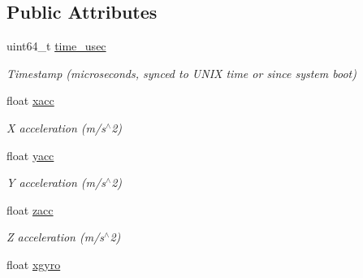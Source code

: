 \subsection*{Public Attributes}
\begin{DoxyCompactItemize}
\item 
\hypertarget{struct____mavlink__highres__imu__t_aaf1a08b7dcf5ed9ca8ce6f66c392d678}{uint64\+\_\+t \hyperlink{struct____mavlink__highres__imu__t_aaf1a08b7dcf5ed9ca8ce6f66c392d678}{time\+\_\+usec}}\label{struct____mavlink__highres__imu__t_aaf1a08b7dcf5ed9ca8ce6f66c392d678}

\begin{DoxyCompactList}\small\item\em Timestamp (microseconds, synced to U\+N\+I\+X time or since system boot) \end{DoxyCompactList}\item 
\hypertarget{struct____mavlink__highres__imu__t_ace5e765b886ddee9ea50983177bea172}{float \hyperlink{struct____mavlink__highres__imu__t_ace5e765b886ddee9ea50983177bea172}{xacc}}\label{struct____mavlink__highres__imu__t_ace5e765b886ddee9ea50983177bea172}

\begin{DoxyCompactList}\small\item\em X acceleration (m/s$^\wedge$2) \end{DoxyCompactList}\item 
\hypertarget{struct____mavlink__highres__imu__t_aedf7c76d0487a09e980851fd6162ae17}{float \hyperlink{struct____mavlink__highres__imu__t_aedf7c76d0487a09e980851fd6162ae17}{yacc}}\label{struct____mavlink__highres__imu__t_aedf7c76d0487a09e980851fd6162ae17}

\begin{DoxyCompactList}\small\item\em Y acceleration (m/s$^\wedge$2) \end{DoxyCompactList}\item 
\hypertarget{struct____mavlink__highres__imu__t_a01f05eb6ed0c4b0db807f22bf6134ab4}{float \hyperlink{struct____mavlink__highres__imu__t_a01f05eb6ed0c4b0db807f22bf6134ab4}{zacc}}\label{struct____mavlink__highres__imu__t_a01f05eb6ed0c4b0db807f22bf6134ab4}

\begin{DoxyCompactList}\small\item\em Z acceleration (m/s$^\wedge$2) \end{DoxyCompactList}\item 
\hypertarget{struct____mavlink__highres__imu__t_ae736b5fdd1185a4ec6c2947d652778e1}{float \hyperlink{struct____mavlink__highres__imu__t_ae736b5fdd1185a4ec6c2947d652778e1}{xgyro}}\label{struct____mavlink__highres__imu__t_ae736b5fdd1185a4ec6c2947d652778e1}


\end{DoxyCompactItemize}
